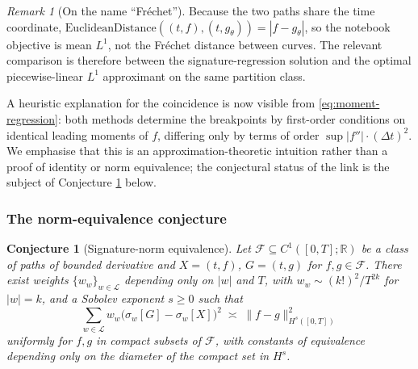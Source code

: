 \documentclass[12pt,english]{article}
\newtheorem{conjecture}[theorem]{Conjecture}
\theoremstyle{remark}
\newtheorem{remark}[theorem]{Remark}
\begin{document}
\begin{remark}[On the name ``Fréchet'']
Because the two paths share the time coordinate, $\mathrm{EuclideanDistance}((t,f),(t,g_{\theta}))=|f-g_{\theta}|$,
so the notebook objective is mean $L^{1}$, not the Fréchet distance
between curves. The relevant comparison is therefore between the signature-regression
solution and the optimal piecewise-linear $L^{1}$ approximant on
the same partition class.
\end{remark}

A heuristic explanation for the coincidence is now visible from \eqref{eq:moment-regression}:
both methods determine the breakpoints by first-order conditions on
identical leading moments of $f$, differing only by terms of order
$\sup|f''|\cdot(\Delta t)^{2}$. We emphasise that this is an
approximation-theoretic intuition rather than a proof of identity
or norm equivalence; the conjectural status of the link is the
subject of Conjecture \ref{conj:norm-equivalence} below.

\subsubsection{The norm-equivalence conjecture}

\begin{conjecture}[Signature-norm equivalence]
\label{conj:norm-equivalence} Let $\mathcal{F}\subseteq C^{1}([0,T];\mathbb{R})$
be a class of paths of bounded derivative and $X=(t,f)$, $G=(t,g)$
for $f,g\in\mathcal{F}$. There exist weights $\{w_{w}\}_{w\in\mathcal{L}}$
depending only on $|w|$ and $T$, with $w_{w}\sim(k!)^{2}/T^{2k}$
for $|w|=k$, and a Sobolev exponent $s\geq0$ such that
\begin{equation}
\sum_{w\in\mathcal{L}}w_{w}\bigl(\sigma_{w}[G]-\sigma_{w}[X]\bigr)^{2}\;\asymp\;\|f-g\|_{H^{s}([0,T])}^{2}\label{eq:norm-equivalence}
\end{equation}
uniformly for $f,g$ in compact subsets of $\mathcal{F}$, with constants
of equivalence depending only on the diameter of the compact set in
$H^{s}$.
\end{conjecture}
\end{document}
